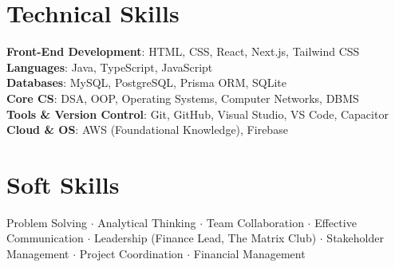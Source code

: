 ﻿\documentclass[letterpaper,10pt]{article}
\begin{document}
\section{Technical Skills}
 \begin{itemize}[leftmargin=0.15in, label={}]
    \small{\item{
     \textbf{Front-End Development}{: HTML, CSS, React, Next.js, Tailwind CSS} \\
     \textbf{Languages}{: Java, TypeScript, JavaScript} \\
     \textbf{Databases}{: MySQL, PostgreSQL, Prisma ORM, SQLite} \\
     \textbf{Core CS}{: DSA, OOP, Operating Systems, Computer Networks, DBMS} \\
     \textbf{Tools \& Version Control}{: Git, GitHub, Visual Studio, VS Code, Capacitor} \\
     \textbf{Cloud \& OS}{: AWS (Foundational Knowledge), Firebase}
    }}
 \end{itemize}

\section{Soft Skills}
 \begin{itemize}[leftmargin=0.15in, label={}]
    \small{\item{
     Problem Solving $\cdot$ Analytical Thinking $\cdot$ Team Collaboration $\cdot$ Effective Communication $\cdot$ Leadership (Finance Lead, The Matrix Club) $\cdot$ Stakeholder Management $\cdot$ Project Coordination $\cdot$ Financial Management
    }}
 \end{itemize}
\end{document}
